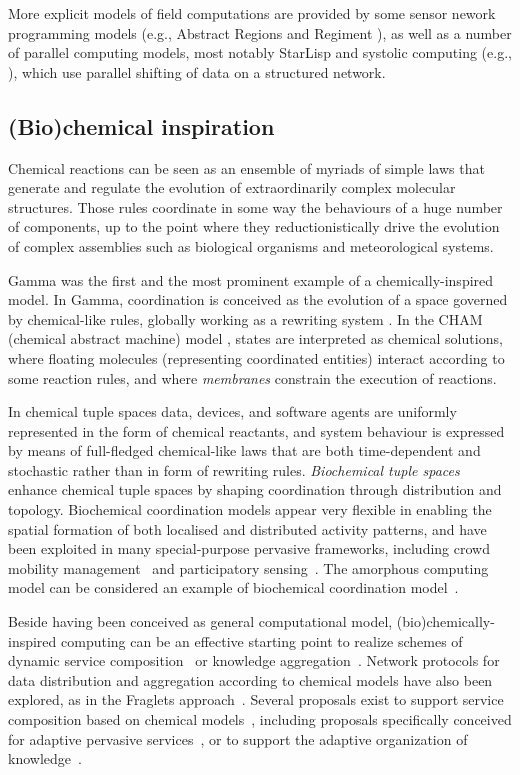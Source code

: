 \documentclass[12pt,a4paper,twoside,openright]{book}
\begin{document}
More explicit models of field computations are provided by some sensor nework programming models (e.g., Abstract Regions \cite{welsh2004regions} and Regiment \cite{regiment}), as well
as a number of parallel computing models, most notably StarLisp \cite{starlisp} and systolic computing (e.g., \cite{SDEF,ReLaCS}), which use parallel shifting of data on a structured network.


\subsection{(Bio)chemical inspiration}

Chemical reactions can be seen as an ensemble of myriads of simple laws that generate and regulate the evolution of extraordinarily complex molecular structures.
%
Those rules coordinate in some way the behaviours of a huge number of components, up to the point where they reductionistically drive the evolution of complex assemblies such as biological organisms and meteorological systems.

Gamma \cite{gamma-scico15} was the first and the most prominent example of a chemically-inspired model.
%
In Gamma, coordination is conceived as the evolution of a space governed by chemical-like rules, globally working as a rewriting system \cite{gamma-lncs2235}.
%
In the CHAM (chemical abstract machine) model \cite{cham-tcs96}, states are interpreted as chemical solutions, where floating molecules (representing coordinated entities) interact according to some reaction rules, and where \emph{membranes} constrain the execution of reactions.

In chemical tuple spaces \cite{chemcoord-soarbook} data, devices, and software agents are uniformly represented in the form of chemical reactants, and system behaviour is expressed by means of full-fledged chemical-like laws that are both time-dependent and stochastic rather than in form of rewriting rules.
%
\emph{Biochemical tuple spaces}~\cite{VCMZ-TAAS2011} enhance chemical tuple spaces by shaping coordination through distribution and topology.
%
Biochemical coordination models appear very flexible in enabling the spatial formation of both localised and distributed activity patterns, and have been exploited in many special-purpose pervasive frameworks, including crowd mobility management~\cite{werfel} and participatory sensing~\cite{lee}. The amorphous computing model can be considered an example of biochemical coordination model~\cite{amorphous}.

Beside having been conceived as general computational model, (bio)chemically-inspired computing can be an effective starting point to realize schemes of dynamic service composition~\cite{frei} or knowledge aggregation~\cite{mariani2013molecules}.
%
Network protocols for data distribution and aggregation according to chemical models have also been explored, as in the Fraglets approach~\cite{Meyer07,Monti13}.
%
Several proposals exist to support service composition based on chemical models~\cite{BanP09}, including proposals specifically conceived for adaptive pervasive services~\cite{cpe}, or to support the adaptive organization of knowledge~\cite{mariani2013molecules}.
\end{document}
